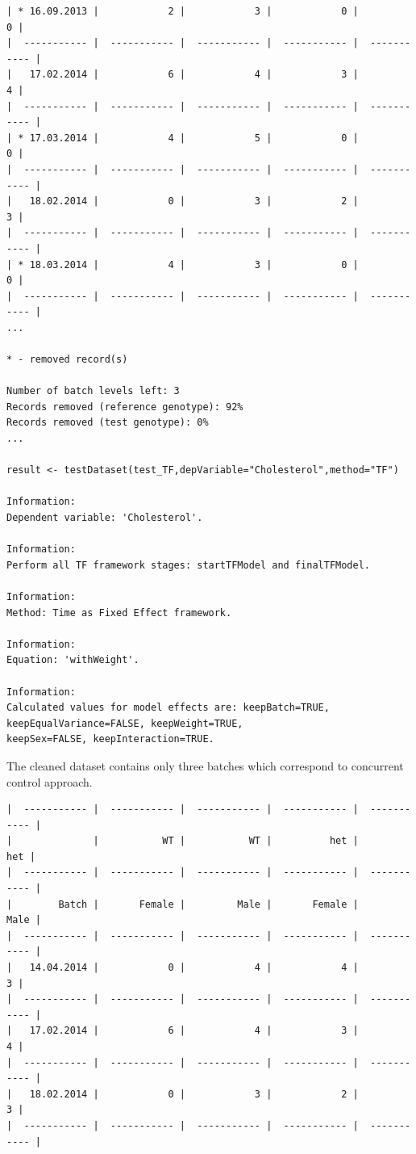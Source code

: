 \documentclass[12pt,a4paper]{article}
\begin{document}
\begin{verbatim}
| * 16.09.2013 |            2 |            3 |            0 |            0 |
|  ----------- |  ----------- |  ----------- |  ----------- |  ----------- |
|   17.02.2014 |            6 |            4 |            3 |            4 |
|  ----------- |  ----------- |  ----------- |  ----------- |  ----------- |
| * 17.03.2014 |            4 |            5 |            0 |            0 |
|  ----------- |  ----------- |  ----------- |  ----------- |  ----------- |
|   18.02.2014 |            0 |            3 |            2 |            3 |
|  ----------- |  ----------- |  ----------- |  ----------- |  ----------- |
| * 18.03.2014 |            4 |            3 |            0 |            0 |
|  ----------- |  ----------- |  ----------- |  ----------- |  ----------- |
...

* - removed record(s)

Number of batch levels left: 3
Records removed (reference genotype): 92%
Records removed (test genotype): 0%
...

result <- testDataset(test_TF,depVariable="Cholesterol",method="TF")

Information:
Dependent variable: 'Cholesterol'.

Information:
Perform all TF framework stages: startTFModel and finalTFModel.

Information:
Method: Time as Fixed Effect framework.

Information:
Equation: 'withWeight'.

Information:
Calculated values for model effects are: keepBatch=TRUE, keepEqualVariance=FALSE, keepWeight=TRUE, 
keepSex=FALSE, keepInteraction=TRUE.

\end{verbatim}
\endgroup

The cleaned dataset contains only three batches which correspond to concurrent control approach. 
\begingroup
\fontsize{8pt}{12pt}\selectfont
\begin{verbatim}
|  ----------- |  ----------- |  ----------- |  ----------- |  ----------- |
|              |           WT |           WT |          het |          het |
|  ----------- |  ----------- |  ----------- |  ----------- |  ----------- |
|        Batch |       Female |         Male |       Female |         Male |
|  ----------- |  ----------- |  ----------- |  ----------- |  ----------- |
|   14.04.2014 |            0 |            4 |            4 |            3 |
|  ----------- |  ----------- |  ----------- |  ----------- |  ----------- |
|   17.02.2014 |            6 |            4 |            3 |            4 |
|  ----------- |  ----------- |  ----------- |  ----------- |  ----------- |
|   18.02.2014 |            0 |            3 |            2 |            3 |
|  ----------- |  ----------- |  ----------- |  ----------- |  ----------- |
\end{verbatim}
\endgroup
\end{document}
